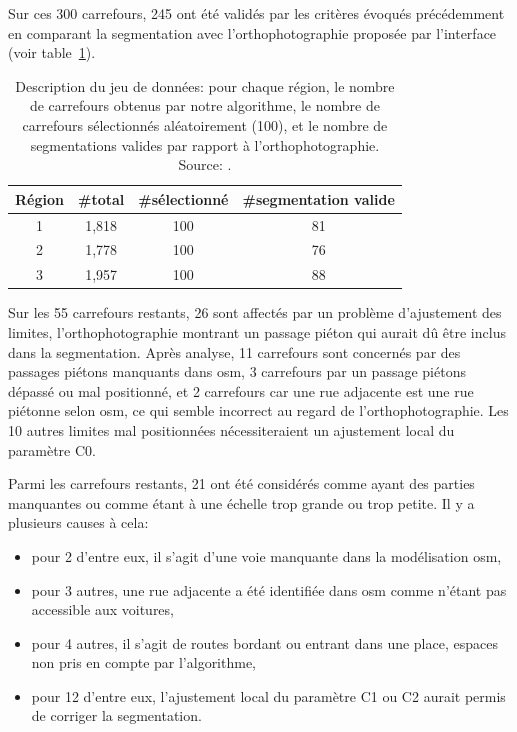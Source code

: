 \newpar{}

Sur ces 300 carrefours, 245 ont été validés par les critères évoqués précédemment en comparant la segmentation avec l'orthophotographie proposée par l'interface (voir table~\ref{tab:nbRegions}).

\newpar{}

\begin{table}[ht]    
    \centering
    \footnotesize
    \begin{tabular}{c|c|c|c}
         Région & \#total & \#sélectionné & \#segmentation valide \\
         \hline
         1 & 1,818 & 100 & 81 \\
         2 & 1,778 & 100 & 76 \\
         3 & 1,957 & 100 & 88 \\
    \end{tabular}
    \caption[Description du jeu de données d'évaluation]{Description du jeu de données: pour chaque région, le nombre de carrefours obtenus par notre algorithme, le nombre de carrefours sélectionnés aléatoirement (100), et le nombre de segmentations valides par rapport à l'orthophotographie. Source: \citep{Favreau2022}.}
    \label{tab:nbRegions}
\end{table}


Sur les 55 carrefours restants, 26 sont affectés par un problème d'ajustement des limites, l'orthophotographie montrant un passage piéton qui aurait dû être inclus dans la segmentation.
Après analyse, 11 carrefours sont concernés par des passages piétons manquants dans \gls{osm}, 3 carrefours par un passage piétons dépassé ou mal positionné, et 2 carrefours car une rue adjacente est une rue piétonne selon \gls{osm}, ce qui semble incorrect au regard de l'orthophotographie. Les 10 autres limites mal positionnées nécessiteraient un ajustement local du paramètre C0.

\newpar{}

Parmi les carrefours restants, 21 ont été considérés comme ayant des parties manquantes ou comme étant à une échelle trop grande ou trop petite. Il y a plusieurs causes à cela: 
\begin{itemize}
    \item pour 2 d'entre eux, il s'agit d'une voie manquante dans la modélisation \gls{osm}, 
    \item pour 3 autres, une rue adjacente a été identifiée dans \gls{osm} comme n'étant pas accessible aux voitures, 
    \item pour 4 autres, il s'agit de routes bordant ou entrant dans une place, espaces non pris en compte par l'algorithme,
    \item pour 12 d'entre eux, l'ajustement local du paramètre C1 ou C2 aurait permis de corriger la segmentation.
\end{itemize}

